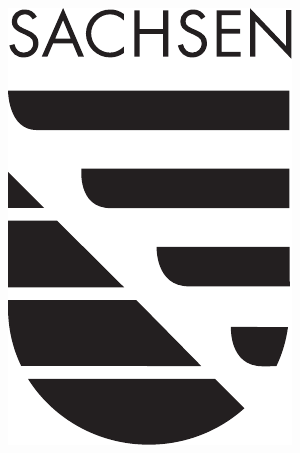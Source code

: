 \documentclass[sw]{iosart2x}
\begin{document}
\begin{ack}
\begin{minipage}{0.04\textwidth}
\includegraphics[width=\textwidth]{img/saxony.pdf}
\end{minipage}
\end{ack}

\nocite{*}


\end{document}
